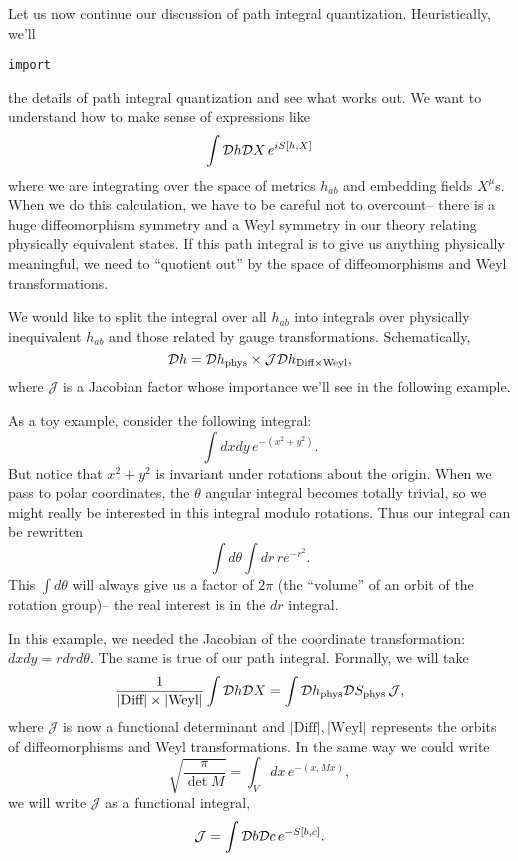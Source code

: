 Let us now continue our discussion of path integral quantization. Heuristically, we'll \begin{verbatim}import\end{verbatim} the details of path integral quantization and see what works out. We want to understand how to make sense of expressions like
\begin{equation}
    \int \mathcal{D} h \mathcal{D} X \,e^{iS[h,X]}
\end{equation}
where we are integrating over the space of metrics $h_{ab}$ and embedding fields $X^\mu$s. When we do this calculation, we have to be careful not to overcount-- there is a huge diffeomorphism symmetry and a Weyl symmetry in our theory relating physically equivalent states. If this path integral is to give us anything physically meaningful, we need to ``quotient out'' by the space of diffeomorphisms and Weyl transformations.

We would like to split the integral over all $h_{ab}$ into integrals over physically inequivalent $h_{ab}$ and those related by gauge transformations. Schematically,
\begin{equation}
    \mathcal{D} h = \mathcal{D} h_{\text{phys}}\times \mathcal{J}\mathcal{D} h_{\text{Diff}\times \text{Weyl}},
\end{equation}
where $\mathcal{J}$ is a Jacobian factor whose importance we'll see in the following example.

\begin{exm}
    As a toy example, consider the following integral:
    \begin{equation*}
        \int dxdy\, e^{-(x^2 +y^2)}.
    \end{equation*}
    But notice that $x^2+y^2$ is invariant under rotations about the origin. When we pass to polar coordinates, the $\theta$ angular integral becomes totally trivial, so we might really be interested in this integral modulo rotations. Thus our integral can be rewritten
    \begin{equation*}
        \int d\theta \int dr \, re^{-r^2}.
    \end{equation*}
    This $\int d\theta$ will always give us a factor of $2\pi$ (the  ``volume'' of an orbit of the rotation group)-- the real interest is in the $dr$ integral.
\end{exm}

In this example, we needed the Jacobian of the coordinate transformation: $dxdy=rdr d\theta$. The same is true of our path integral. Formally, we will take
\begin{equation}
    \frac{1}{|\text{Diff}|\times |\text{Weyl}|}\int \mathcal{D} h \mathcal{D} X = \int \mathcal{D} h_{\text{phys}}\mathcal{D} S_{\text{phys}} \,\mathcal{J},
\end{equation}
where $\mathcal{J}$ is now a functional determinant and $|\text{Diff}|, |\text{Weyl}|$ represents the orbits of diffeomorphisms and Weyl transformations.
%
In the same way we could write
\begin{equation}
    \sqrt{\frac{\pi}{\det M}}=\int_V dx \,e^{-(x,Mx)},
\end{equation}
we will write $\mathcal{J}$ as a functional integral,
\begin{equation}
    \mathcal J =\int \mathcal{D} b \mathcal{D} c\, e^{-S[b,c]}.
\end{equation}


